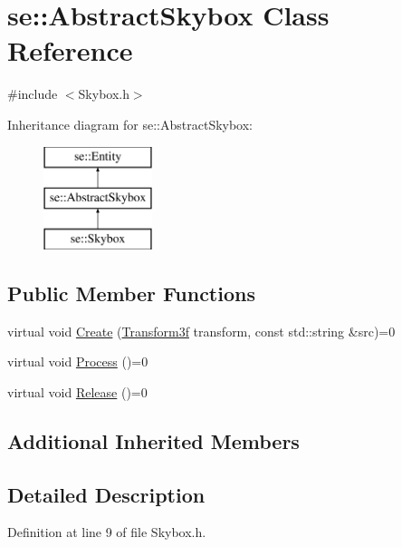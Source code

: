 \hypertarget{classse_1_1_abstract_skybox}{}\section{se\+:\+:Abstract\+Skybox Class Reference}
\label{classse_1_1_abstract_skybox}


{\ttfamily \#include $<$Skybox.\+h$>$}

Inheritance diagram for se\+:\+:Abstract\+Skybox\+:\begin{figure}[H]
\begin{center}
\leavevmode
\includegraphics[height=3.000000cm]{classse_1_1_abstract_skybox}
\end{center}
\end{figure}
\subsection*{Public Member Functions}
\begin{DoxyCompactItemize}
\item 
virtual void \mbox{\hyperlink{classse_1_1_abstract_skybox_ad9c98023e2ae2cfbb6c84929a1b9f46b}{Create}} (\mbox{\hyperlink{classse_1_1_transform3f}{Transform3f}} transform, const std\+::string \&src)=0
\item 
virtual void \mbox{\hyperlink{classse_1_1_abstract_skybox_a652add712c92f3d7ebe7f82dc353fa1c}{Process}} ()=0
\item 
virtual void \mbox{\hyperlink{classse_1_1_abstract_skybox_a5aa158b7db1140ffc5c696347f32e2ef}{Release}} ()=0
\end{DoxyCompactItemize}
\subsection*{Additional Inherited Members}


\subsection{Detailed Description}


Definition at line 9 of file Skybox.\+h.



